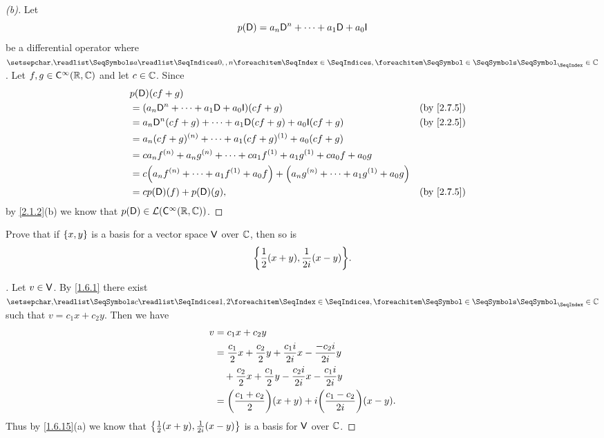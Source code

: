 \begin{proof}[(b)]
  Let
  \[
    p(\Dop) = a_n \Dop^n + \cdots + a_1 \Dop + a_0 \IT
  \]
  be a differential operator where \(\seq{a}{0,,n} \in \C\).
  Let \(f, g \in \cfs[\infty](\R, \C)\) and let \(c \in \mathbb{C}\).
  Since
  \begin{align*}
     & p(\Dop)(cf + g)                                                                                                                     \\
     & = \pa{a_n \Dop^n + \cdots + a_1 \Dop + a_0 \IT}(cf + g)                                               &  & \text{(by \cref{2.7.5})} \\
     & = a_n \Dop^n(cf + g) + \cdots + a_1 \Dop(cf + g) + a_0 \IT(cf + g)                                    &  & \text{(by \cref{2.2.5})} \\
     & = a_n (cf + g)^{(n)} + \cdots + a_1 (cf + g)^{(1)} + a_0 (cf + g)                                                                   \\
     & = c a_n f^{(n)} + a_n g^{(n)} + \cdots + c a_1 f^{(1)} + a_1 g^{(1)} + c a_0 f + a_0 g                                              \\
     & = c \pa{a_n f^{(n)} + \cdots + a_1 f^{(1)} + a_0 f} + \pa{a_n g^{(n)} + \cdots + a_1 g^{(1)} + a_0 g}                               \\
     & = c p(\Dop)(f) + p(\Dop)(g),                                                                          &  & \text{(by \cref{2.7.5})}
  \end{align*}
  by \cref{2.1.2}(b) we know that \(p(\Dop) \in \ls(\cfs[\infty](\R, \C))\).
\end{proof}

\begin{ex}\label{ex:2.7.7}
  Prove that if \(\left\lbrace x, y\right\rbrace\) is a basis for a vector space \(\mathsf{V}\) over \(\mathbb{C}\), then so is
  \[
    \set{\frac{1}{2} (x + y), \frac{1}{2i} (x - y)}.
  \]
\end{ex}

\begin{proof}[]
  Let \(v \in \mathsf{V}\).
  By \cref{1.6.1} there exist \(\seq{c}{1,2} \in \C\) such that \(v = c_1 x + c_2 y\).
  Then we have
  \begin{align*}
    v & = c_1 x + c_2 y                                                                      \\
      & = \frac{c_1}{2} x + \frac{c_2}{2} y + \frac{c_1 i}{2 i} x - \frac{-c_2 i}{2 i} y     \\
      & \quad + \frac{c_2}{2} x + \frac{c_1}{2} y - \frac{c_2 i}{2 i} x - \frac{c_1 i}{2i} y \\
      & = \pa{\frac{c_1 + c_2}{2}} (x + y) + i \pa{\frac{c_1 - c_2}{2i}} (x - y).
  \end{align*}
  Thus by \cref{1.6.15}(a) we know that \(\left\lbrace\frac{1}{2} (x + y), \frac{1}{2i} (x - y)\right\rbrace\) is a basis for \(\mathsf{V}\) over \(\mathbb{C}\).
\end{proof}

